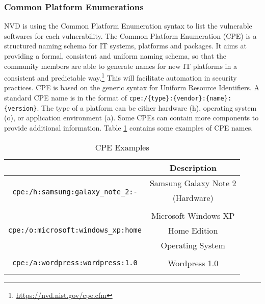 \subsubsection{Common Platform Enumerations}
NVD is using the Common Platform Enumeration syntax to list the vulnerable softwares for each vulnerability. The Common Platform Enumeration (CPE) is a structured naming schema for IT systems, platforms and packages. It aims at providing a formal, consistent and uniform naming schema, so that the community members are able to generate names for new IT platforms in a consistent and predictable way.\footnote{\url{https://nvd.nist.gov/cpe.cfm}} This will facilitate automation in security practices. CPE is based on the generic syntax for Uniform Resource Identifiers. A standard CPE name is in the format of \texttt{cpe:/\{type\}:\{vendor\}:\{name\}:\{version\}}. The type of a platform can be either hardware (h), operating system (o), or application environment (a). Some CPEs can contain more components to provide additional information. Table \ref{table:sample_cpes} contains some examples of CPE names. 
\begin{table}
\begin{center}
    \begin{tabular}{ | c | c | }
    
    \hline
	 \hhline{|*2-}
     \multicolumn{1}{|c|}{\cellcolor{LightBlue}\textbf{CPE}} &  \multicolumn{1}{|c|}{\cellcolor{LightBlue}\textbf{Description}}  
    \\ \hline
    \multirow{3}{*}{\texttt{cpe:/h:samsung:galaxy\_note\_2:-}} & Samsung Galaxy Note 2 \\ & (Hardware) \\ & 
        \\ \hline
   \multirow{3}{*}{\texttt{cpe:/o:microsoft:windows\_xp:home}} & Microsoft Windows XP \\ & Home Edition \\ & Operating System
        \\ \hline
         \multirow{3}{*}{\texttt{cpe:/a:wordpress:wordpress:1.0}} &  \\ & Wordpress 1.0 \\ & 
        \\ \hline
    \end{tabular}
    \caption{CPE Examples}
    \label{table:sample_cpes}
   \end{center}
    
\end{table}

